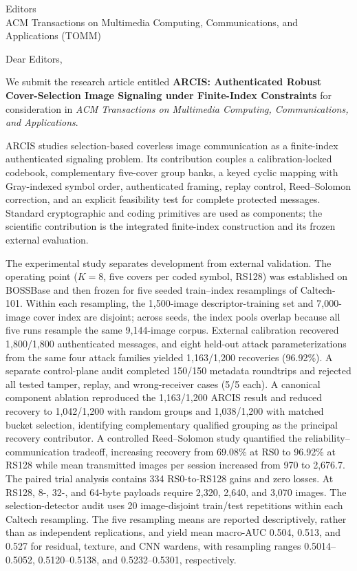 \documentclass[10pt]{letter}
\begin{document}
\begin{letter}{Editors\\ACM Transactions on Multimedia Computing, Communications, and Applications (TOMM)}
\opening{Dear Editors,}

We submit the research article entitled \textbf{ARCIS: Authenticated Robust Cover-Selection Image Signaling under Finite-Index Constraints} for consideration in \emph{ACM Transactions on Multimedia Computing, Communications, and Applications}.

ARCIS studies selection-based coverless image communication as a finite-index authenticated signaling problem. Its contribution couples a calibration-locked codebook, complementary five-cover group banks, a keyed cyclic mapping with Gray-indexed symbol order, authenticated framing, replay control, Reed--Solomon correction, and an explicit feasibility test for complete protected messages. Standard cryptographic and coding primitives are used as components; the scientific contribution is the integrated finite-index construction and its frozen external evaluation.

The experimental study separates development from external validation. The operating point ($K=8$, five covers per coded symbol, RS128) was established on BOSSBase and then frozen for five seeded train--index resamplings of Caltech-101. Within each resampling, the 1,500-image descriptor-training set and 7,000-image cover index are disjoint; across seeds, the index pools overlap because all five runs resample the same 9,144-image corpus. External calibration recovered 1,800/1,800 authenticated messages, and eight held-out attack parameterizations from the same four attack families yielded 1,163/1,200 recoveries (96.92\%). A separate control-plane audit completed 150/150 metadata roundtrips and rejected all tested tamper, replay, and wrong-receiver cases (5/5 each). A canonical component ablation reproduced the 1,163/1,200 ARCIS result and reduced recovery to 1,042/1,200 with random groups and 1,038/1,200 with matched bucket selection, identifying complementary qualified grouping as the principal recovery contributor. A controlled Reed--Solomon study quantified the reliability--communication tradeoff, increasing recovery from 69.08\% at RS0 to 96.92\% at RS128 while mean transmitted images per session increased from 970 to 2,676.7. The paired trial analysis contains 334 RS0-to-RS128 gains and zero losses. At RS128, 8-, 32-, and 64-byte payloads require 2,320, 2,640, and 3,070 images. The selection-detector audit uses 20 image-disjoint train/test repetitions within each Caltech resampling. The five resampling means are reported descriptively, rather than as independent replications, and yield mean macro-AUC 0.504, 0.513, and 0.527 for residual, texture, and CNN wardens, with resampling ranges 0.5014--0.5052, 0.5120--0.5138, and 0.5232--0.5301, respectively.


\end{letter}
\end{document}
